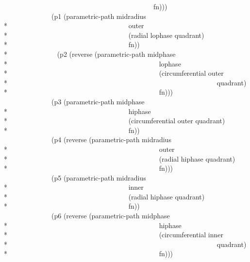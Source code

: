 \begin{new}
\begin{lisp}
~~~~~~~~~~~~~~~~~~~~~~~~~~~~~~~~~~~~~~~~~~~~fn))) \\
~~~~~~~~~~~~~~(p1 (parametric-path midradius \\*
~~~~~~~~~~~~~~~~~~~~~~~~~~~~~~~~~~~outer \\*
~~~~~~~~~~~~~~~~~~~~~~~~~~~~~~~~~~~(radial lophase quadrant) \\*
~~~~~~~~~~~~~~~~~~~~~~~~~~~~~~~~~~~fn)) \\*
~~~~~~~~~~~~~~(p2 (reverse (parametric-path midphase \\*
~~~~~~~~~~~~~~~~~~~~~~~~~~~~~~~~~~~~~~~~~~~~lophase \\*
~~~~~~~~~~~~~~~~~~~~~~~~~~~~~~~~~~~~~~~~~~~~(circumferential outer \\*
~~~~~~~~~~~~~~~~~~~~~~~~~~~~~~~~~~~~~~~~~~~~~~~~~~~~~~~~~~~~~quadrant) \\*
~~~~~~~~~~~~~~~~~~~~~~~~~~~~~~~~~~~~~~~~~~~~fn))) \\
~~~~~~~~~~~~~~(p3 (parametric-path midphase \\*
~~~~~~~~~~~~~~~~~~~~~~~~~~~~~~~~~~~hiphase \\*
~~~~~~~~~~~~~~~~~~~~~~~~~~~~~~~~~~~(circumferential outer quadrant) \\*
~~~~~~~~~~~~~~~~~~~~~~~~~~~~~~~~~~~fn)) \\
~~~~~~~~~~~~~~(p4 (reverse (parametric-path midradius \\*
~~~~~~~~~~~~~~~~~~~~~~~~~~~~~~~~~~~~~~~~~~~~outer \\*
~~~~~~~~~~~~~~~~~~~~~~~~~~~~~~~~~~~~~~~~~~~~(radial hiphase quadrant) \\*
~~~~~~~~~~~~~~~~~~~~~~~~~~~~~~~~~~~~~~~~~~~~fn))) \\
~~~~~~~~~~~~~~(p5 (parametric-path midradius \\*
~~~~~~~~~~~~~~~~~~~~~~~~~~~~~~~~~~~inner \\*
~~~~~~~~~~~~~~~~~~~~~~~~~~~~~~~~~~~(radial hiphase quadrant) \\*
~~~~~~~~~~~~~~~~~~~~~~~~~~~~~~~~~~~fn)) \\
~~~~~~~~~~~~~~(p6 (reverse (parametric-path midphase \\*
~~~~~~~~~~~~~~~~~~~~~~~~~~~~~~~~~~~~~~~~~~~~hiphase \\*
~~~~~~~~~~~~~~~~~~~~~~~~~~~~~~~~~~~~~~~~~~~~(circumferential inner \\*
~~~~~~~~~~~~~~~~~~~~~~~~~~~~~~~~~~~~~~~~~~~~~~~~~~~~~~~~~~~~~quadrant) \\*
~~~~~~~~~~~~~~~~~~~~~~~~~~~~~~~~~~~~~~~~~~~~fn))) \\

\end{lisp}
\end{new}
